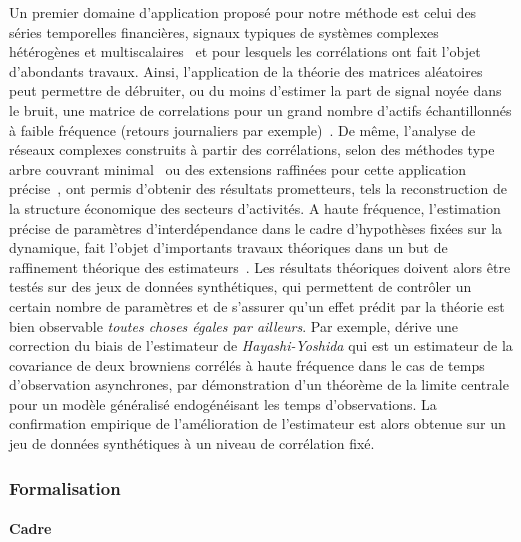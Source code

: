 Un premier domaine d'application proposé pour notre méthode est celui des séries temporelles financières, signaux typiques de systèmes complexes hétérogènes et multiscalaires~\cite{mantegna2000introduction} et pour lesquels les corrélations ont fait l'objet d'abondants travaux. Ainsi, l'application de la théorie des matrices aléatoires peut permettre de débruiter, ou du moins d'estimer la part de signal noyée dans le bruit, une matrice de correlations pour un grand nombre d'actifs échantillonnés à faible fréquence (retours journaliers par exemple)~\cite{2009arXiv0910.1205B}. De même, l'analyse de réseaux complexes construits à partir des corrélations, selon des méthodes type arbre couvrant minimal~\cite{2001PhyA..299...16B} ou des extensions raffinées pour cette application précise~\cite{tumminello2005tool}, ont permis d'obtenir des résultats prometteurs, tels la reconstruction de la structure économique des secteurs d'activités. A haute fréquence, l'estimation précise de paramètres d'interdépendance dans le cadre d'hypothèses fixées sur la dynamique, fait l'objet d'importants travaux théoriques dans un but de raffinement théorique des estimateurs~\cite{barndorff2011multivariate}. Les résultats théoriques doivent alors être testés sur des jeux de données synthétiques, qui permettent de contrôler un certain nombre de paramètres et de s'assurer qu'un effet prédit par la théorie est bien observable \emph{toutes choses égales par ailleurs}. Par exemple, \cite{potiron2015estimation} dérive une correction du biais de l'estimateur de \emph{Hayashi-Yoshida} qui est un estimateur de la covariance de deux browniens corrélés à haute fréquence dans le cas de temps d'observation asynchrones, par démonstration d'un théorème de la limite centrale pour un modèle généralisé endogénéisant les temps d'observations. La confirmation empirique de l'amélioration de l'estimateur est alors obtenue sur un jeu de données synthétiques à un niveau de corrélation fixé.


\subsubsection{Formalisation}

\paragraph{Cadre}

